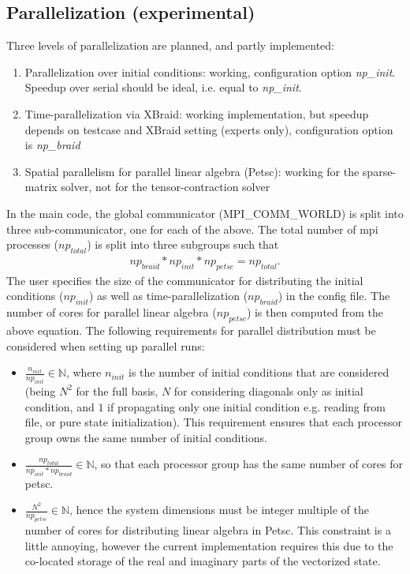 \documentclass[letterpaper]{article}
\begin{document}
  \subsection{Parallelization (experimental)}
    Three levels of parallelization are planned, and partly implemented: 
      \begin{enumerate}
        \item Parallelization over initial conditions: working, configuration
          option \textit{np\_init}. Speedup over serial should be ideal, i.e.
          equal to \textit{np\_init}.
        \item Time-parallelization via XBraid: working implementation, but
          speedup depends on testcase and XBraid setting (experts only),
          configuration option is \textit{np\_braid}
        \item Spatial parallelism for parallel linear algebra (Petsc): working
          for the sparse-matrix solver, not for the tensor-contraction solver
      \end{enumerate}
      In the main code, the global communicator (MPI\_COMM\_WORLD) is split into
      three sub-communicator, one for each of the above. The total number of mpi
      processes ($np_{total}$) is split into three subgroups such that 
       \begin{align*}
         np_{braid} * np_{init} * np_{petsc} = np_{total}.
       \end{align*}
      The user specifies the size of the communicator for distributing the
      initial conditions ($np_{init}$) as well as time-parallelization
      ($np_{braid}$) in the config file. The number of cores for parallel linear
      algebra ($np_{petsc}$) is then computed from the above equation. The
      following requirements for parallel distribution must be considered when
      setting up parallel runs:
      \begin{itemize}
        \item $\frac{n_{init}}{np_{init}} \in \mathds{N}$, where $n_{init}$ is
          the number of initial conditions that are considered (being $N^2$ for
          the full basis, $N$ for considering diagonals only as initial
          condition, and $1$ if propagating only one initial condition e.g.
          reading from file, or pure state initialization). This requirement
          ensures that each processor group owns the same number of initial
          conditions.
        \item $\frac{np_{total}}{np_{init}*np_{braid}} \in \mathds{N}$, so that
          each processor group has the same number of cores for petsc.
        \item $\frac{N^2}{np_{petsc}} \in \mathds{N}$, hence the system
          dimensions must be integer multiple of the number of cores for
          distributing linear algebra in Petsc. This constraint is a little
          annoying, however the current implementation requires this due to the
          co-located storage of the real and imaginary parts of the vectorized
          state.
      \end{itemize}
  
\end{document}
